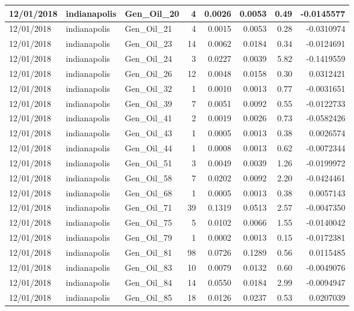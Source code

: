\documentclass[
  letterpaper,
  DIV=11,
  numbers=noendperiod]{scrartcl}
\begin{document}
\begin{tabular}{l|l|l|r|r|r|r|r}
\hline
12/01/2018 & indianapolis & Gen\_Oil\_20 & 4 & 0.0026 & 0.0053 & 0.49 & -0.0145577\\
\hline
12/01/2018 & indianapolis & Gen\_Oil\_21 & 4 & 0.0015 & 0.0053 & 0.28 & -0.0310974\\
\hline
12/01/2018 & indianapolis & Gen\_Oil\_23 & 14 & 0.0062 & 0.0184 & 0.34 & -0.0124691\\
\hline
12/01/2018 & indianapolis & Gen\_Oil\_24 & 3 & 0.0227 & 0.0039 & 5.82 & -0.1419559\\
\hline
12/01/2018 & indianapolis & Gen\_Oil\_26 & 12 & 0.0048 & 0.0158 & 0.30 & 0.0312421\\
\hline
12/01/2018 & indianapolis & Gen\_Oil\_32 & 1 & 0.0010 & 0.0013 & 0.77 & -0.0031651\\
\hline
12/01/2018 & indianapolis & Gen\_Oil\_39 & 7 & 0.0051 & 0.0092 & 0.55 & -0.0122733\\
\hline
12/01/2018 & indianapolis & Gen\_Oil\_41 & 2 & 0.0019 & 0.0026 & 0.73 & -0.0582426\\
\hline
12/01/2018 & indianapolis & Gen\_Oil\_43 & 1 & 0.0005 & 0.0013 & 0.38 & 0.0026574\\
\hline
12/01/2018 & indianapolis & Gen\_Oil\_44 & 1 & 0.0008 & 0.0013 & 0.62 & -0.0072344\\
\hline
12/01/2018 & indianapolis & Gen\_Oil\_51 & 3 & 0.0049 & 0.0039 & 1.26 & -0.0199972\\
\hline
12/01/2018 & indianapolis & Gen\_Oil\_58 & 7 & 0.0202 & 0.0092 & 2.20 & -0.0424461\\
\hline
12/01/2018 & indianapolis & Gen\_Oil\_68 & 1 & 0.0005 & 0.0013 & 0.38 & 0.0057143\\
\hline
12/01/2018 & indianapolis & Gen\_Oil\_71 & 39 & 0.1319 & 0.0513 & 2.57 & -0.0047350\\
\hline
12/01/2018 & indianapolis & Gen\_Oil\_75 & 5 & 0.0102 & 0.0066 & 1.55 & -0.0140042\\
\hline
12/01/2018 & indianapolis & Gen\_Oil\_79 & 1 & 0.0002 & 0.0013 & 0.15 & -0.0172381\\
\hline
12/01/2018 & indianapolis & Gen\_Oil\_81 & 98 & 0.0726 & 0.1289 & 0.56 & 0.0115485\\
\hline
12/01/2018 & indianapolis & Gen\_Oil\_83 & 10 & 0.0079 & 0.0132 & 0.60 & -0.0049076\\
\hline
12/01/2018 & indianapolis & Gen\_Oil\_84 & 14 & 0.0550 & 0.0184 & 2.99 & -0.0094947\\
\hline
12/01/2018 & indianapolis & Gen\_Oil\_85 & 18 & 0.0126 & 0.0237 & 0.53 & 0.0207039\\

\end{tabular}
\end{document}
